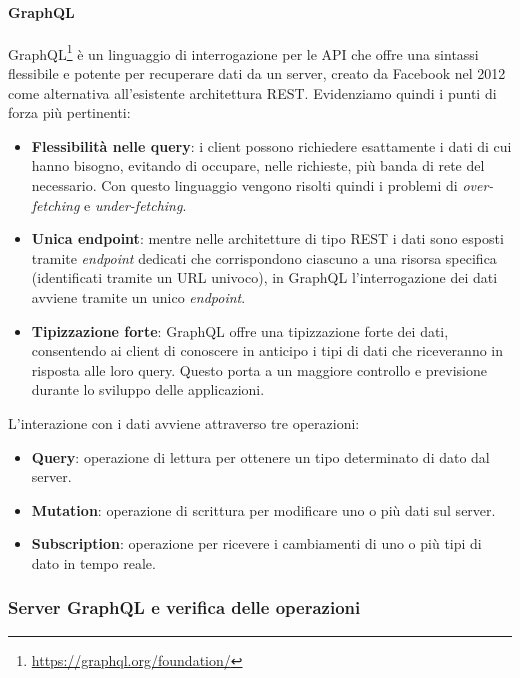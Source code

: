 \paragraph{GraphQL}
  GraphQL\footnote{\url{https://graphql.org/foundation/}} è un linguaggio di interrogazione per le \ac{API} che offre una sintassi flessibile e potente per recuperare dati da un server, creato da Facebook nel 2012 come alternativa all'esistente architettura \ac{REST}. Evidenziamo quindi i punti di forza più pertinenti:
\begin{itemize}
	\item \textbf{Flessibilità nelle query}: i client possono richiedere esattamente i dati di cui hanno bisogno, evitando di occupare, nelle richieste, più banda di rete del necessario. Con questo linguaggio vengono risolti quindi i problemi di \textit{over-fetching} e \textit{under-fetching}.
	\item \textbf{Unica endpoint}:  mentre nelle architetture di tipo \ac{REST} i dati sono esposti tramite \textit{endpoint} dedicati che corrispondono ciascuno a una risorsa specifica (identificati tramite un \ac{URL} univoco), in GraphQL l'interrogazione dei dati avviene tramite un unico \textit{endpoint}.
	\item \textbf{Tipizzazione forte}: GraphQL offre una tipizzazione forte dei dati, consentendo ai client di conoscere in anticipo i tipi di dati che riceveranno in risposta alle loro query. Questo porta a un maggiore controllo e previsione durante lo sviluppo delle applicazioni.
\end{itemize}
L'interazione con i dati avviene attraverso tre operazioni: 
\begin{itemize}
	\item \textbf{Query}: operazione di lettura per ottenere un tipo determinato di dato dal server.
	\item \textbf{Mutation}:  operazione di scrittura per modificare uno o più dati sul server.
	\item \textbf{Subscription}: operazione per ricevere i cambiamenti di uno o più tipi di dato in tempo reale.
\end{itemize}

\subsubsection{Server GraphQL e verifica delle operazioni}\label{subsection:graphql-server}

